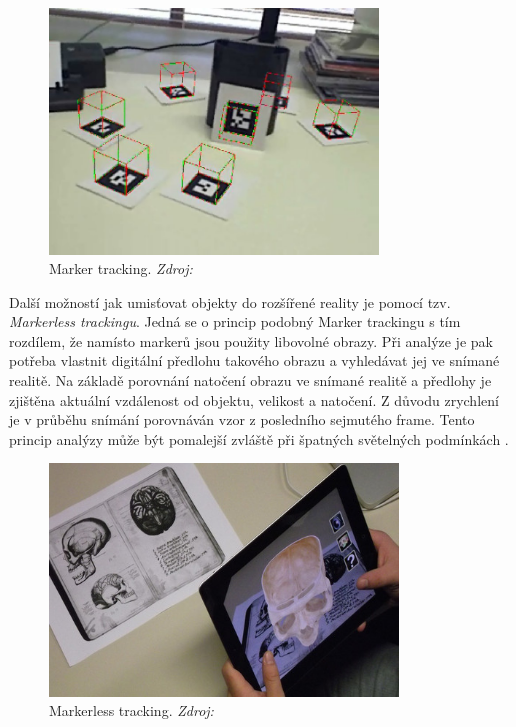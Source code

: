 \documentclass[twoside,12pt]{article}
\begin{document}
\begin{figure}[H]
    \includegraphics[width=330px, center]{images/marker-tracking.jpg}
    \caption[]{Marker tracking. \textit{Zdroj: \cite{marker_tracking}}}
    \label{marker_tracking}
\end{figure}

Další možností jak umisťovat objekty do rozšířené reality je pomocí tzv. \textit{Markerless trackingu}. Jedná se o princip podobný Marker trackingu s tím rozdílem, že namísto markerů jsou použity libovolné obrazy. Při analýze je pak potřeba vlastnit digitální předlohu takového obrazu a vyhledávat jej ve snímané realitě. Na základě porovnání natočení obrazu ve snímané realitě a předlohy je zjištěna aktuální vzdálenost od objektu, velikost a natočení. Z důvodu zrychlení je v průběhu snímání porovnáván vzor z posledního sejmutého frame. Tento princip analýzy může být pomalejší zvláště při špatných světelných podmínkách \cite{handbook_of_ar}.

\begin{figure}[H]
    \includegraphics[width=350px, center]{images/markerless-tracking.jpg}
    \caption{Markerless tracking. \textit{Zdroj: \cite{markerless_tracking}}}
    \label{markerless_tracking}
\end{figure}
\end{document}
